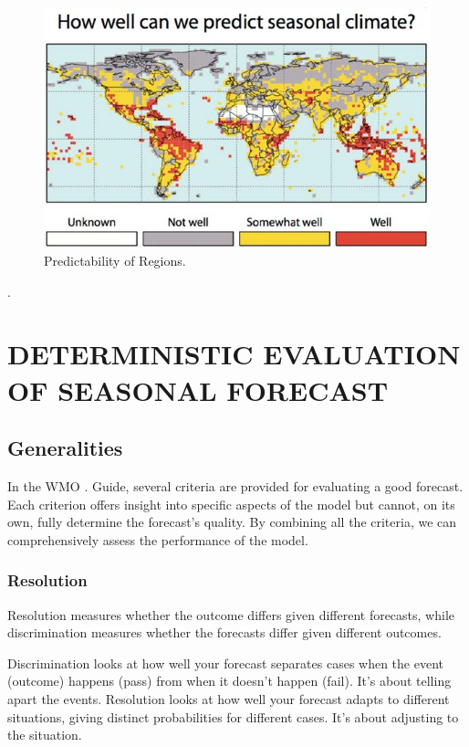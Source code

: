 \documentclass[11pt]{article}
\begin{document}
\begin{figure}[h]
    \centering
    \includegraphics[scale=0.5]{REGIONS_PREDICTIBILITY.png}
    \caption*{Predictability of Regions.\footnotemark{} }
\end{figure}
.

\section{DETERMINISTIC EVALUATION OF SEASONAL FORECAST}

	\subsection{Generalities}
In the WMO\footnotemark{} . Guide, several criteria are provided for evaluating a good forecast. Each criterion offers insight into specific aspects of the model but cannot, on its own, fully determine the forecast's quality. By combining all the criteria, we can comprehensively assess the performance of the model.	 
		\subsubsection{Resolution}
	Resolution measures whether the outcome differs given different forecasts, while discrimination measures whether the forecasts differ given different outcomes.

Discrimination looks at how well your forecast separates cases when the event (outcome) happens (pass) from when it doesn’t happen (fail). It’s about telling apart the events.
Resolution looks at how well your forecast adapts to different situations, giving distinct probabilities for different cases. It’s about adjusting to the situation.
\end{document}
